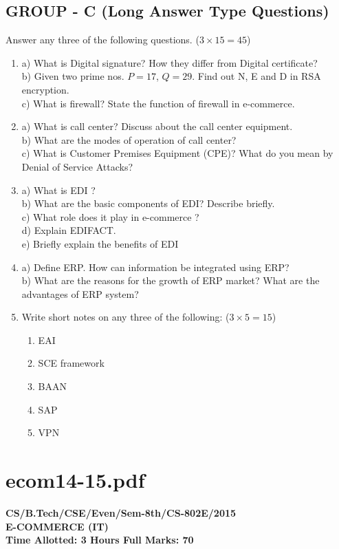 \documentclass{article}
\begin{document}
\subsection*{GROUP - C (Long Answer Type Questions)}
Answer any three of the following questions. ($3 \times 15 = 45$)
\begin{enumerate}
    \item[7.] 
    a) What is Digital signature? How they differ from Digital certificate? \\
    b) Given two prime nos. $P=17$, $Q=29$. Find out N, E and D in RSA encryption. \\
    c) What is firewall? State the function of firewall in e-commerce.
    \item[8.] 
    a) What is call center? Discuss about the call center equipment. \\
    b) What are the modes of operation of call center? \\
    c) What is Customer Premises Equipment (CPE)? What do you mean by Denial of Service Attacks?
    \item[9.] 
    a) What is EDI ? \\
    b) What are the basic components of EDI? Describe briefly. \\
    c) What role does it play in e-commerce ? \\
    d) Explain EDIFACT. \\
    e) Briefly explain the benefits of EDI
    \item[10.] 
    a) Define ERP. How can information be integrated using ERP? \\
    b) What are the reasons for the growth of ERP market? What are the advantages of ERP system?
    \item[11.] Write short notes on any three of the following: ($3 \times 5 = 15$)
    \begin{enumerate}
        \item[a)] EAI
        \item[b)] SCE framework
        \item[c)] BAAN
        \item[d)] SAP
        \item[e)] VPN
    \end{enumerate}
\end{enumerate}

\newpage
\section*{ecom14-15.pdf}
\textbf{CS/B.Tech/CSE/Even/Sem-8th/CS-802E/2015} \\
\textbf{E-COMMERCE (IT)} \\
\textbf{Time Allotted: 3 Hours \hfill Full Marks: 70}
\end{document}
